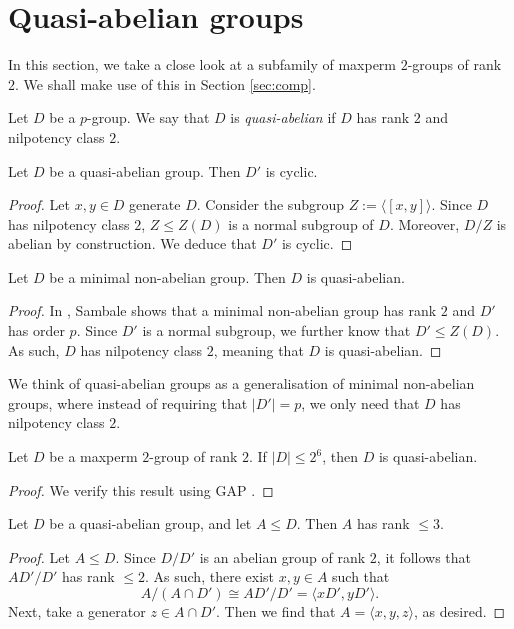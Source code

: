 \documentclass[bysection, amsart]{standard}
\begin{document}
\section{Quasi-abelian groups} \label{sec:quasi-ab}
In this section, we take a close look at a subfamily of maxperm $2$-groups of rank $2$. We shall make use of this in Section \ref{sec:comp}.

\begin{definition}
    Let $D$ be a $p$-group. We say that $D$ is \emph{quasi-abelian} if $D$ has rank $2$ and nilpotency class $2$.
\end{definition}

\begin{lemma}
    Let $D$ be a quasi-abelian group. Then $D'$ is cyclic.
\end{lemma}
\begin{proof}
    Let $x, y \in D$ generate $D$. Consider the subgroup $Z := \langle [x, y] \rangle$. Since $D$ has nilpotency class $2$, $Z \leq Z(D)$ is a normal subgroup of $D$. Moreover, $D/Z$ is abelian by construction. We deduce that $D'$ is cyclic.
\end{proof}

\begin{lemma} \label{lm:minab-qab}
    Let $D$ be a minimal non-abelian group. Then $D$ is quasi-abelian.
\end{lemma}
\begin{proof}
    In \cite[Lemma 12.1]{book:sambale}, Sambale shows that a minimal non-abelian group has rank $2$ and $D'$ has order $p$. Since $D'$ is a normal subgroup, we further know that $D' \leq Z(D)$. As such, $D$ has nilpotency class $2$, meaning that $D$ is quasi-abelian.
\end{proof}
\noindent We think of quasi-abelian groups as a generalisation of minimal non-abelian groups, where instead of requiring that $|D'| = p$, we only need that $D$ has nilpotency class $2$.

\begin{lemma} \label{lm:qab-small}
    Let $D$ be a maxperm $2$-group of rank $2$. If $|D| \leq 2^6$, then $D$ is quasi-abelian.
\end{lemma}
\begin{proof}
    We verify this result using GAP \cite{GAP4}.
\end{proof}

\begin{lemma}
    Let $D$ be a quasi-abelian group, and let $A \leq D$. Then $A$ has rank $\leq 3$.
\end{lemma}
\begin{proof}
    Let $A \leq D$. Since $D/D'$ is an abelian group of rank $2$, it follows that $AD'/D'$ has rank $\leq 2$. As such, there exist $x, y \in A$ such that 
    \[A / (A \cap D') \cong AD' / D' = \langle xD', yD' \rangle.\]
    Next, take a generator $z \in A \cap D'$. Then we find that $A = \langle x, y, z \rangle$, as desired.
\end{proof}
\end{document}
